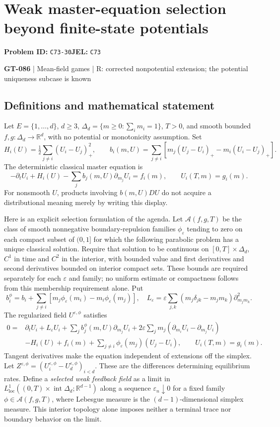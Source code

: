 \documentclass[11pt,a4paper]{article}
\begin{document}
\section*{Weak master-equation selection beyond finite-state potentials}
\textbf{Problem ID:} \texttt{C73-30}\quad \textbf{JEL:} \texttt{C73}\par
\label{problem:OP-0216}
\label{game:GT-086}
{\sffamily\small\color{muted}
{\small\textbf{GT-086} | Mean-field games | R: corrected nonpotential extension; the potential uniqueness subcase is known\par}
\par}
\subsection*{Definitions and mathematical statement}
Let $E=\{1,\ldots,d\}$, $d\geq3$, $\Delta_d=\{m\geq0:\sum_i m_i=1\}$, $T>0$, and smooth bounded $f,g:\Delta_d\to\mathbb R^d$, with no potential or monotonicity assumption. Set
\[
 H_i(U)=\tfrac12\sum_{j\ne i}(U_i-U_j)_+^2,\qquad
 b_i(m,U)=\sum_{j\ne i}[m_j(U_j-U_i)_+-m_i(U_i-U_j)_+].
\]
The deterministic classical master equation is
\[
 -\partial_tU_i+H_i(U)-\sum_j b_j(m,U)\partial_{m_j}U_i=f_i(m),
 \qquad U_i(T,m)=g_i(m).
\]
For nonsmooth $U$, products involving $b(m,U)DU$ do not acquire a distributional meaning merely by writing this display.

Here is an explicit selection formulation of the agenda. Let $\mathcal A(f,g,T)$ be the class of smooth nonnegative boundary-repulsion families $\phi_\varepsilon$ tending to zero on each compact subset of $(0,1]$ for which the following parabolic problem has a unique classical solution. Require that solution to be continuous on $[0,T]\times\Delta_d$, $C^1$ in time and $C^2$ in the interior, with bounded value and first derivatives and second derivatives bounded on interior compact sets. These bounds are required separately for each $\varepsilon$ and family; no uniform estimate or compactness follows from this membership requirement alone. Put
\[
 b_i^\phi=b_i+\sum_{j\ne i}[m_j\phi_\varepsilon(m_i)-m_i\phi_\varepsilon(m_j)],\quad
 L_\varepsilon=\varepsilon\sum_{j,k}(m_j\delta_{jk}-m_jm_k)\partial_{m_jm_k}^2.
\]
The regularized field $U^{\varepsilon,\phi}$ satisfies
\[
 \begin{split}
 0={}&\partial_tU_i+L_\varepsilon U_i+\sum_j b_j^\phi(m,U)\partial_{m_j}U_i
 +2\varepsilon\sum_jm_j(\partial_{m_i}U_i-\partial_{m_j}U_i)\\
 &-H_i(U)+f_i(m)+\sum_{j\ne i}\phi_\varepsilon(m_j)(U_j-U_i),
 \qquad U_i(T,m)=g_i(m).
 \end{split}
\]
Tangent derivatives make the equation independent of extensions off the simplex. Let $Z^{\varepsilon,\phi}=(U_i^{\varepsilon,\phi}-U_d^{\varepsilon,\phi})_{i<d}$. These are the differences determining equilibrium rates. Define a \emph{selected weak feedback field} as a limit in $L^1_{\mathrm{loc}}((0,T)\times\operatorname{int}\Delta_d;\mathbb R^{d-1})$ along a sequence $\varepsilon_n\downarrow0$ for a fixed family $\phi\in\mathcal A(f,g,T)$, where Lebesgue measure is the $(d-1)$-dimensional simplex measure. This interior topology alone imposes neither a terminal trace nor boundary behavior on the limit.
\end{document}
